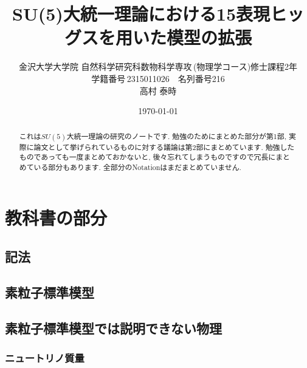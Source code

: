 \documentclass[uplatex,dvipdfmx,a4paper,titlepage]{jsbook}
\theoremstyle{plain}
\theoremstyle{definition}
\begin{document}
\title{SU(5)大統一理論における15表現ヒッグスを用いた模型の拡張}
\author{金沢大学大学院\,\,自然科学研究科数物科学専攻\,(物理学コース)修士課程2年\\学籍番号\,2315011026$\quad$名列番号216\\高村 泰時} 
\date{\today}
\maketitle

\tableofcontents
\clearpage

\begin{abstract}
  これは$SU(5)$大統一理論の研究のノートです.
  勉強のためにまとめた部分が第1部, 実際に論文として挙げられているものに対する議論は第2部にまとめています.
  勉強したものであっても一度まとめておかないと, 後々忘れてしまうものですので冗長にまとめている部分もあります.
  全部分のNotationはまだまとめていません.
\end{abstract}

\part{教科書の部分}

\chapter{記法}


\chapter{素粒子標準模型}


\chapter{素粒子標準模型では説明できない物理}


\section{ニュートリノ質量}




\end{document}
